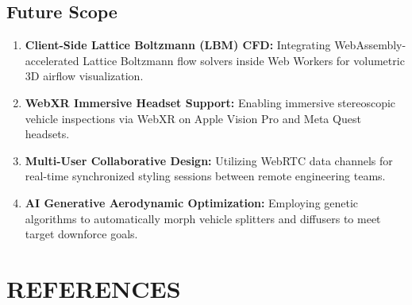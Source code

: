 \documentclass[12pt,a4paper]{report}
\begin{document}
\section{Future Scope}
\begin{enumerate}
    \item \textbf{Client-Side Lattice Boltzmann (LBM) CFD:} Integrating WebAssembly-accelerated Lattice Boltzmann flow solvers inside Web Workers for volumetric 3D airflow visualization.
    \item \textbf{WebXR Immersive Headset Support:} Enabling immersive stereoscopic vehicle inspections via WebXR on Apple Vision Pro and Meta Quest headsets.
    \item \textbf{Multi-User Collaborative Design:} Utilizing WebRTC data channels for real-time synchronized styling sessions between remote engineering teams.
    \item \textbf{AI Generative Aerodynamic Optimization:} Employing genetic algorithms to automatically morph vehicle splitters and diffusers to meet target downforce goals.
\end{enumerate}

\chapter{REFERENCES}
\end{document}
